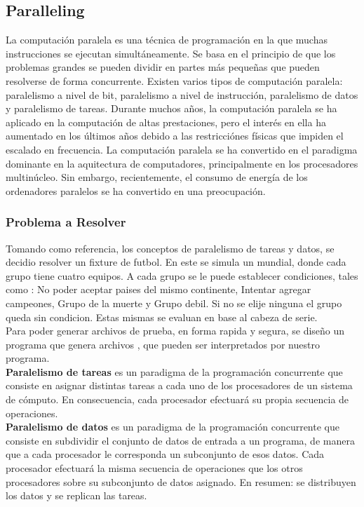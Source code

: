 \documentclass[10pt,a4paper]{article}
\begin{document}
\subsection{Paralleling}
La computaci\'on paralela es una t\'ecnica de programaci\'on en la que muchas instrucciones se ejecutan simult\'aneamente. Se basa en el principio de que los problemas grandes se pueden dividir en partes m\'as peque\~nas que pueden resolverse de forma concurrente. Existen varios tipos de computaci\'on paralela: paralelismo a nivel de bit, paralelismo a nivel de instrucci\'on, paralelismo de datos y paralelismo de tareas. Durante muchos a\~nos, la computaci\'on paralela se ha aplicado en la computaci\'on de altas prestaciones, pero el inter\'es en ella ha aumentado en los \'ultimos a\~nos debido a las restricci\'ones f\'isicas que impiden el escalado en frecuencia. La computaci\'on paralela se ha convertido en el paradigma dominante en la aquitectura de computadores, principalmente en los procesadores multin\'ucleo. Sin embargo, recientemente, el consumo de energ\'ia de los ordenadores paralelos se ha convertido en una preocupaci\'on. 

\subsubsection{Problema a Resolver}
Tomando como referencia, los conceptos de paralelismo de tareas y datos, se decidio resolver un fixture de futbol. En este se simula un mundial,  donde cada grupo tiene cuatro equipos. A cada grupo se le puede establecer condiciones, tales como : No poder aceptar paises del mismo continente, Intentar agregar campeones, Grupo de la muerte y Grupo debil. Si no se elije ninguna el grupo queda sin condicion. Estas mismas se evaluan en base al cabeza de serie.\\
Para poder generar archivos de prueba, en forma rapida y segura, se dise\~no un programa que genera archivos , que pueden ser interpretados por nuestro programa. \\
\textbf{Paralelismo de tareas} es un paradigma de la programaci\'on concurrente que consiste en asignar distintas tareas a cada uno de los procesadores de un sistema de c\'omputo. En consecuencia, cada procesador efectuar\'a su propia secuencia de operaciones.\\ \textbf{Paralelismo de datos} es un paradigma de la programaci\'on concurrente que consiste en subdividir el conjunto de datos de entrada a un programa, de manera que a cada procesador le corresponda un subconjunto de esos datos. Cada procesador efectuar\'a la misma secuencia de operaciones que los otros procesadores sobre su subconjunto de datos asignado. En resumen: se distribuyen los datos y se replican las tareas.\\
\end{document}

